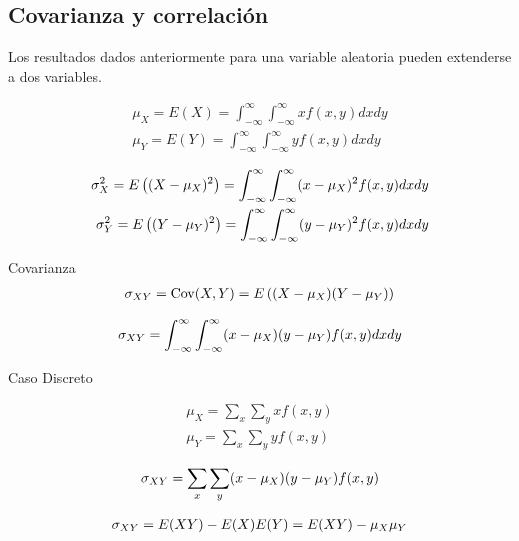 \subsection{Covarianza y correlación}

Los resultados dados anteriormente para una variable aleatoria pueden extenderse a dos variables.


{}

\[
 \label{eq:2.9.19}
 \begin{split}
  \mu_{X}=E(X)=\int_{-\infty}^{\infty}\int_{-\infty}^{\infty} xf(x,y)dxdy\\ 
  \mu_{Y}=E(Y)=\int_{-\infty}^{\infty}\int_{-\infty}^{\infty}
  yf(x,y)dxdy
 \end{split}
\]





\[
 \label{eq:2.9.20}
 \begin{split}
  \sigma^{2}_{X}=E\left( (X-\mu_{X})^{2} \right)=\int_{-\infty}^{\infty}\int_{-\infty}^{\infty} (x-\mu_{X})^2f(x,y)dxdy\\ 
  \sigma^{2}_{Y}=E\left( (Y-\mu_{Y})^{2} \right)=\int_{-\infty}^{\infty}\int_{-\infty}^{\infty} (y-\mu_{Y})^2f(x,y)dxdy
 \end{split}
\]


{Covarianza}
 \begin{align}
 \label{eq:2.9.21}
  \sigma_{XY}=\operatorname{Cov}(X,Y)=E\left( (X-\mu_{X})(Y-\mu_{Y}) \right)
 \end{align}



 \begin{align}
  \label{eq:2.9.22}
  \sigma_{XY}=\int_{-\infty}^{\infty}
  \int_{-\infty}^{\infty}
  (x-\mu_{X})(y-\mu_{Y})f(x,y)dxdy
 \end{align}


{Caso Discreto}

 \[
  \begin{split}
   \mu_{X}=\sum_{x}\sum_{y}xf(x,y) \\
  \mu_{Y}=\sum_{x}\sum_{y}yf(x,y)
  \end{split}
 \]



 \begin{align}
  \label{eq:2.9.23}
  \sigma_{XY}=\sum_{x}\sum_{y}(x-\mu_{X})(y-\mu_{Y})f(x,y)
 \end{align}



 \begin{align}
  \label{eq:2.9.24}
  \sigma_{XY}=E(XY)-E(X)E(Y)=E(XY)-\mu_{X}\mu_{Y}
 \end{align}


